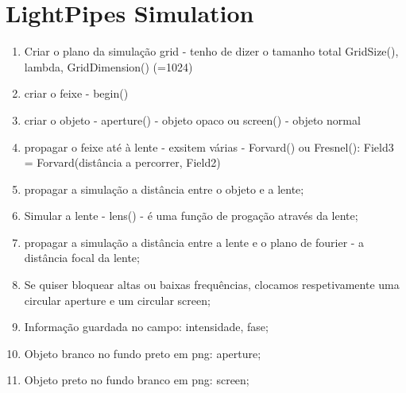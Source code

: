\documentclass{article}
\begin{document}
\newpage 

\section*{LightPipes Simulation}


\begin{enumerate}
  \item Criar o plano da simulação grid - tenho de dizer o tamanho total GridSize(), lambda, GridDimension() (=1024)
  \item criar o feixe - begin()
  \item criar o objeto - aperture() - objeto opaco ou screen() - objeto normal
  \item propagar o feixe até à lente - exsitem várias - Forvard() ou Fresnel(): Field3 = Forvard(distância  a percorrer, Field2)
  \item propagar a simulação a distância entre o objeto e a lente;
  \item Simular a lente - lens() - é uma função de progação através da lente;
  \item propagar a simulação a distância entre a lente e o plano de fourier - a distância focal da lente;
  \item Se quiser bloquear altas ou baixas frequências, clocamos respetivamente uma circular aperture e um circular screen;
  \item Informação guardada no campo: intensidade, fase;
  \item Objeto branco no fundo preto em png: aperture;
  \item Objeto preto no fundo branco em png: screen;
\end{enumerate}

\end{document}
